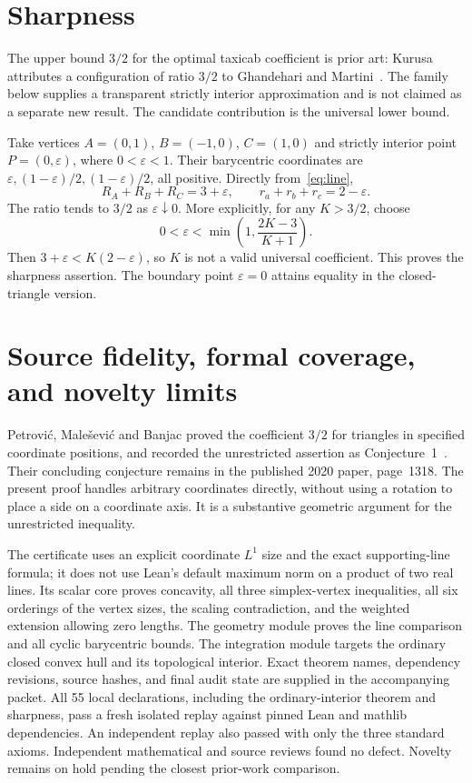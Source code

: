 \documentclass[11pt]{article}
\begin{document}
\section{Sharpness}
The upper bound $3/2$ for the optimal taxicab coefficient is prior art: Kurusa~\cite[Section~7.3.4]{kurusa} attributes a configuration of ratio $3/2$ to Ghandehari and Martini~\cite[Figure~3]{gm}. The family below supplies a transparent strictly interior approximation and is not claimed as a separate new result. The candidate contribution is the universal lower bound.

Take vertices $A=(0,1)$, $B=(-1,0)$, $C=(1,0)$ and strictly interior point $P=(0,\varepsilon)$, where $0<\varepsilon<1$. Their barycentric coordinates are $\varepsilon,(1-\varepsilon)/2,(1-\varepsilon)/2$, all positive. Directly from~\eqref{eq:line},
\[
 R_A+R_B+R_C=3+\varepsilon,\qquad
 r_a+r_b+r_c=2-\varepsilon.
\]
The ratio tends to $3/2$ as $\varepsilon\downarrow0$. More explicitly, for any $K>3/2$, choose
\[
 0<\varepsilon<\min\left(1,\frac{2K-3}{K+1}\right).
\]
Then $3+\varepsilon<K(2-\varepsilon)$, so $K$ is not a valid universal coefficient. This proves the sharpness assertion. The boundary point $\varepsilon=0$ attains equality in the closed-triangle version.

\section{Source fidelity, formal coverage, and novelty limits}
Petrovi\'c, Male\v{s}evi\'c and Banjac proved the coefficient $3/2$ for triangles in specified coordinate positions, and recorded the unrestricted assertion as Conjecture~1~\cite{pmb}. Their concluding conjecture remains in the published 2020 paper, page~1318. The present proof handles arbitrary coordinates directly, without using a rotation to place a side on a coordinate axis. It is a substantive geometric argument for the unrestricted inequality.

The certificate uses an explicit coordinate $L^1$ size and the exact supporting-line formula; it does not use Lean's default maximum norm on a product of two real lines. Its scalar core proves concavity, all three simplex-vertex inequalities, all six orderings of the vertex sizes, the scaling contradiction, and the weighted extension allowing zero lengths. The geometry module proves the line comparison and all cyclic barycentric bounds. The integration module targets the ordinary closed convex hull and its topological interior. Exact theorem names, dependency revisions, source hashes, and final audit state are supplied in the accompanying packet. All 55 local declarations, including the ordinary-interior theorem and sharpness, pass a fresh isolated replay against pinned Lean and mathlib dependencies. An independent replay also passed with only the three standard axioms. Independent mathematical and source reviews found no defect. Novelty remains on hold pending the closest prior-work comparison.
\end{document}

